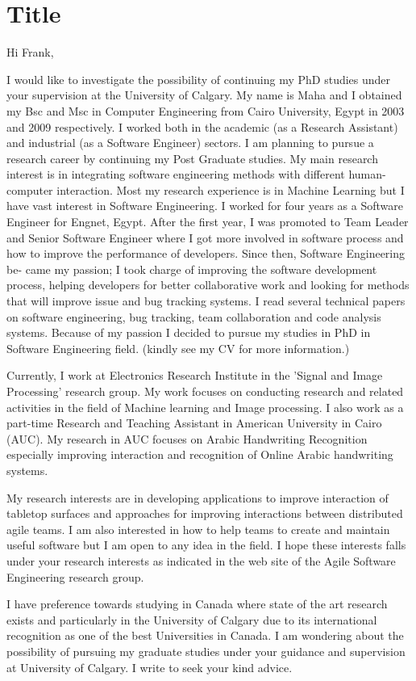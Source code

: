 \documentclass{article}
\begin{document}
\section{Title}

Hi Frank,

I would like to investigate the possibility of continuing my PhD studies under your supervision at the University of Calgary. My name is Maha and I obtained my Bsc and Msc in Computer Engineering from Cairo University, Egypt in 2003 and 2009 respectively. I worked both in the academic (as a Research Assistant) and industrial (as a Software Engineer) sectors. I am planning to pursue a research career by continuing my Post Graduate studies. My main research interest is in integrating software engineering methods with different human-computer interaction.
Most my research experience is in Machine Learning but I have vast interest in Software Engineering. I worked for four years as a Software Engineer for Engnet, Egypt. After the first year, I was promoted to Team Leader and Senior Software Engineer where I got more involved in software process and how to improve the performance of developers. Since then, Software Engineering be- came my passion; I took charge of improving the software development process, helping developers for better collaborative work and looking for methods that will improve issue and bug tracking systems. I read several technical papers on software engineering, bug tracking, team collaboration and code analysis systems. Because of my passion I decided to pursue my studies in PhD in Software Engineering field. (kindly see my CV for more information.)

Currently, I work at Electronics Research Institute in the 'Signal and Image Processing' research group. My work focuses on conducting research and related activities in the field of Machine learning and Image processing. I also work as a part-time Research and Teaching Assistant in American University in Cairo (AUC). My research in AUC focuses on Arabic Handwriting Recognition especially improving interaction and recognition of Online Arabic handwriting systems.

My research interests are in developing applications to improve interaction of tabletop surfaces and approaches for improving interactions between distributed agile teams. I am also interested in how to help teams to create and maintain useful software but I am open to any idea in the field. I hope these interests falls under your research interests as indicated in the web site of the Agile Software Engineering research group.

I have preference towards studying in Canada where state of the art research exists and particularly in the University of Calgary due to its international recognition as one of the best Universities in Canada. I am wondering about the possibility of pursuing my graduate studies under your guidance and supervision at University of Calgary. I write to seek your kind advice.
\end{document}
